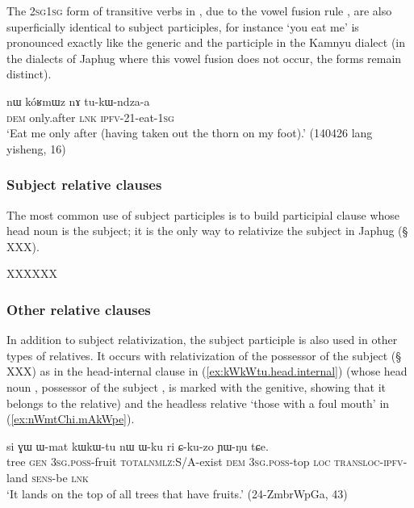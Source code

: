 The \textsc{2sg}\fl{}\textsc{1sg} form of transitive verbs in , due to the vowel fusion rule  \fl{} , are also superficially identical to subject participles, for instance  `you eat me' is pronounced  exactly like the generic and the participle  in the Kamnyu dialect (in the dialects of Japhug where this vowel fusion does not occur, the forms remain distinct).

\begin{exe}
\ex \label{ex:tukWndzaa}
 \gll nɯ kóʁmɯz nɤ tu-kɯ-ndza-a \\
 \textsc{dem} only.after \textsc{lnk} \textsc{ipfv}-2\fl{}1-eat-\textsc{1sg} \\
 \glt `Eat me only after (having taken out the thorn on my foot).' (140426 lang yisheng, 16)
\end{exe}



\subsubsection{Subject relative clauses}  \label{ex:subject.participle.subject.relative}
The most common use of subject participles is to build participial clause whose head noun is the subject; it is the only way to relativize the subject in Japhug (§ XXX).


XXXXXX
\subsubsection{Other relative clauses}  \label{ex:subject.participle.other.relative}
In addition to subject relativization, the subject participle is also used in other types of relatives. It occurs with relativization of the possessor of the subject (§ XXX) as in the head-internal clause in (\ref{ex:kWkWtu.head.internal}) (whose head noun , possessor of the subject ,  is marked with the genitive, showing that it belongs to the relative) and the headless relative  `those with a foul mouth' in (\ref{ex:nWmtChi.mAkWpe}).

\begin{exe}
\ex \label{ex:kWkWtu.head.internal}
 \gll si ɣɯ ɯ-mat kɯ\redp{}kɯ-tu nɯ ɯ-ku ri ɕ-ku-zo ɲɯ-ŋu tɕe. \\
 tree \textsc{gen} \textsc{3sg}.\textsc{poss}-fruit \textsc{total}\redp{}\textsc{nmlz}:S/A-exist \textsc{dem} \textsc{3sg}.\textsc{poss}-top \textsc{loc} \textsc{transloc}-\textsc{ipfv}-land \textsc{sens}-be \textsc{lnk} \\
 \glt `It lands on the top of all trees that have fruits.' (24-ZmbrWpGa, 43)
\end{exe}
 

